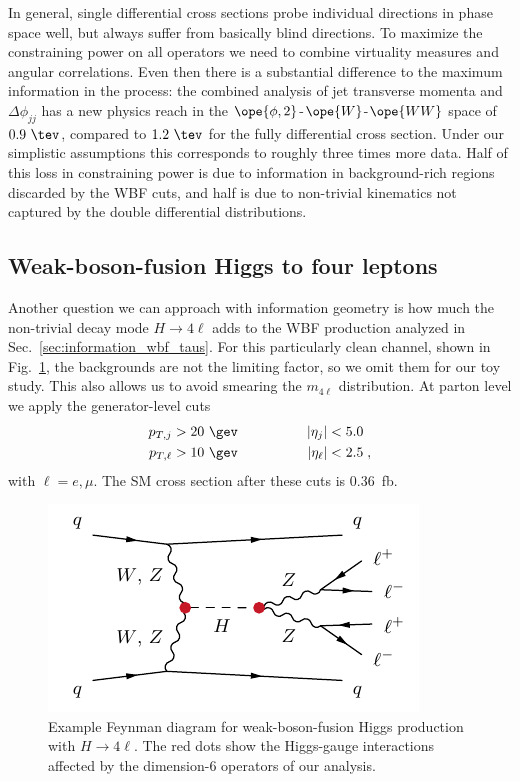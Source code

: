 In general, single differential cross sections probe individual
directions in phase space well, but always suffer from basically blind
directions. To maximize the constraining power on all operators we
need to combine virtuality measures and angular correlations. Even
then there is a substantial difference to the maximum information in
the process: the combined analysis of jet transverse momenta and
$\Delta \phi_{jj}$ has a new physics reach in the
$\ope{\phi,2}$-$\ope{W}$-$\ope{WW}$ space of $0.9~\tev$, compared to
$1.2~\tev$ for the fully differential cross section.  Under our
simplistic assumptions this corresponds to roughly three times more
data.  Half of this loss in constraining power is due to information
in background-rich regions discarded by the WBF cuts, and half is due
to non-trivial kinematics not captured by the double differential
distributions.



\subsection{Weak-boson-fusion Higgs to four leptons}
\label{sec:information_wbf_4l}

Another question we can approach with information geometry is how much
the non-trivial decay mode $H \to 4 \ell$ adds to the WBF production
analyzed in Sec.~\ref{sec:information_wbf_taus}. For this particularly clean
channel, shown in Fig.~\ref{fig:information_wbf_4l_diag}, the backgrounds are
not the limiting factor, so we omit them for our toy study. This also 
allows us to avoid smearing the $m_{4\ell}$ distribution. At parton
level we apply the generator-level cuts
%
\begin{alignat}{2}
  p_{T,j} &> 20 \ \gev \qquad & \qquad |\eta_{j}| &< 5.0  \notag \\ 
  p_{T,\ell} &> 10 \ \gev  \qquad & \qquad |\eta_{\ell}| &< 2.5 \; ,
\label{eq:wbf_4l_acceptance_cuts}
\end{alignat}
%
with $\ell = e, \mu$. The SM cross section after these cuts is 0.36~fb. 

\begin{figure}[b]
  \includegraphics[width=0.44 \textwidth]{fig/information/wbf_4l_diag.pdf}%
  \caption{Example Feynman diagram for weak-boson-fusion Higgs production with
    $H \to 4 \ell$. The red dots show the Higgs-gauge interactions
    affected by the dimension-6 operators of our analysis.}
\label{fig:information_wbf_4l_diag}
\end{figure}



